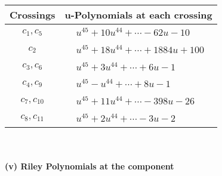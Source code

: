 \documentclass[1p]{elsarticle_modified}
\theoremstyle{definition}
\begin{document}
\begin{tabular}{m{50pt}|m{274pt}}
Crossings & \hspace{64pt}u-Polynomials at each crossing \\
\hline $$\begin{aligned}c_{1},c_{5}\end{aligned}$$&$\begin{aligned}
&u^{45}+10 u^{44}+\cdots-62 u-10
\end{aligned}$\\
\hline $$\begin{aligned}c_{2}\end{aligned}$$&$\begin{aligned}
&u^{45}+18 u^{44}+\cdots+1884 u+100
\end{aligned}$\\
\hline $$\begin{aligned}c_{3},c_{6}\end{aligned}$$&$\begin{aligned}
&u^{45}+3 u^{44}+\cdots+6 u-1
\end{aligned}$\\
\hline $$\begin{aligned}c_{4},c_{9}\end{aligned}$$&$\begin{aligned}
&u^{45}- u^{44}+\cdots+8 u-1
\end{aligned}$\\
\hline $$\begin{aligned}c_{7},c_{10}\end{aligned}$$&$\begin{aligned}
&u^{45}+11 u^{44}+\cdots-398 u-26
\end{aligned}$\\
\hline $$\begin{aligned}c_{8},c_{11}\end{aligned}$$&$\begin{aligned}
&u^{45}+2 u^{44}+\cdots-3 u-2
\end{aligned}$\\
\hline
\end{tabular}\\~\\
\newpage\renewcommand{\arraystretch}{1}
\flushleft \textbf{(v) Riley Polynomials at the component}\newline \\
\end{document}
